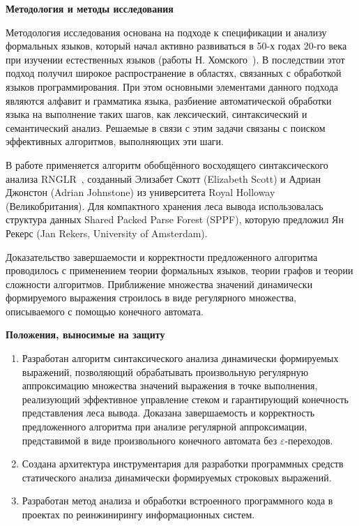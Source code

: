 \textbf{Методология и методы исследования}

Методология исследования основана на подходе к спецификации и анализу формальных языков, который начал активно развиваться в 50-х годах 20-го века при изучении естественных языков (работы Н. Хомского~\cite{chomskyMethod ,chomskySyntactic}). В последствии этот подход получил широкое распространение в областях, связанных с обработкой языков программирования.
При этом основными элементами данного подхода являются алфавит и грамматика языка, разбиение автоматической обработки языка на выполнение таких шагов, как лексический, синтаксический и семантический анализ. Решаемые в связи с этим задачи связаны с поиском эффективных алгоритмов, выполняющих эти шаги. 

В работе применяется алгоритм обобщённого восходящего синтаксического анализа RNGLR~\cite{RNGLR}, созданный Элизабет Скотт (Elizabeth Scott) и Адриан Джонстон (Adrian Johnstone) из университета Royal Holloway (Великобритания). Для компактного хранения леса вывода использовалась структура данных Shared Packed Parse Forest (SPPF), которую предложил Ян Рекерс (Jan Rekers, University of Amsterdam).

Доказательство завершаемости и корректности предложенного алгоритма проводилось с применением теории формальных языков, теории графов и теории сложности алгоритмов. Приближение множества значений динамически формируемого выражения строилось в виде регулярного множества, описываемого с помощью конечного автомата.


\textbf{Положения, выносимые на защиту}
\begin{enumerate}
    \item Разработан алгоритм синтаксического анализа динамически формируемых выражений, позволяющий обрабатывать произвольную регулярную аппроксимацию множества значений выражения в точке выполнения, реализующий 
    эффективное управление стеком и гарантирующий конечность представления леса вывода. Доказана завершаемость и корректность предложенного алгоритма при анализе регулярной аппроксимации, представимой в виде произвольного конечного автомата без $\varepsilon$-переходов. 
    \item Создана архитектура инструментария для разработки программных средств статического анализа динамически формируемых строковых выражений.
    \item Разработан метод анализа и обработки встроенного программного кода в проектах по реинжинирингу информационных систем. 
\end{enumerate}


